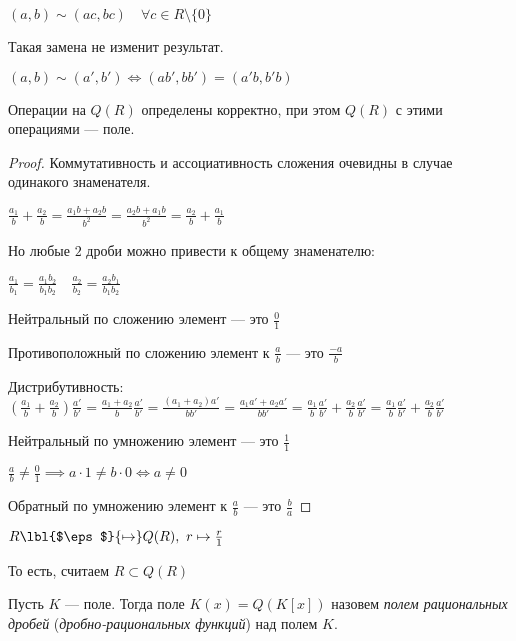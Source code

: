 \begin{notice}
    $(a, b) \sim (ac, bc) \quad \forall c \in R \setminus \{0\}$

    Такая замена не изменит результат.
\end{notice}

\begin{notice}
    $(a, b) \sim (a', b') \iff (ab', bb') = (a'b, b'b)$
\end{notice}

\begin{theorem-non}
    Операции на $Q(R)$ определены корректно, при этом $Q(R)$ с этими операциями --- поле.
\end{theorem-non}

\begin{proof}
    Коммутативность и ассоциативность сложения очевидны в случае одинакого знаменателя.

    $\frac{a_1}{b} + \frac{a_2}{b} = \frac{a_1 b + a_2 b}{b^2} = \frac{a_2 b + a_1 b}{b^2} = \frac{a_2}{b} + \frac{a_1}{b}$

    Но любые $2$ дроби можно привести к общему знаменателю:

    $\frac{a_1}{b_1} = \frac{a_1 b_2}{b_1 b_2} \quad \frac{a_2}{b_2} = \frac{a_2 b_1}{b_1 b_2}$

    Нейтральный по сложению элемент --- это $\frac{0}{1}$

    Противоположный по сложению элемент к $\frac{a}{b}$ --- это $\frac{-a}{b}$

    Дистрибутивность: $\left( \frac{a_1}{b} + \frac{a_2}{b} \right) \frac{a'}{b'} = \frac{a_1 + a_2}{b} \frac{a'}{b'} = \frac{(a_1 + a_2) a'}{b b'} = \frac{a_1a' + a_2a'}{b b'} = \frac{a_1}{b} \frac{a'}{b'} + \frac{a_2}{b} \frac{a'}{b'} = \frac{a_1}{b} \frac{a'}{b'} + \frac{a_2}{b} \frac{a'}{b'}$

    Нейтральный по умножению элемент --- это $\frac{1}{1}$

    $\frac{a}{b} \neq \frac{0}{1} \implies a \cdot 1 \neq b \cdot 0 \iff a \neq 0$

    Обратный по умножению элемент к $\frac{a}{b}$ --- это $\frac{b}{a}$
\end{proof}

\begin{notice}
    $R \lbl{$\eps$}{\mapsto} Q(R),~ r \mapsto \frac{r}{1}$
    
    То есть, считаем $R \subset Q(R)$
\end{notice}

\begin{defn}
    Пусть $K$ --- поле. Тогда поле $K(x) = Q(K[x])$ назовем \emph{полем рациональных дробей} (\emph{дробно-рациональных функций}) над полем $K$.
\end{defn}


